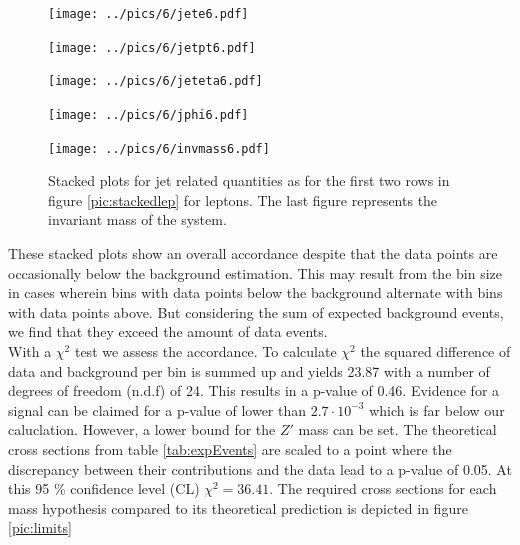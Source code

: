 \begin{figure}
\begin{minipage}{\minwidththree\textwidth}
 \texttt{[image: ../pics/6/jete6.pdf]}
\end{minipage}
\begin{minipage}{\minwidththree\textwidth}
 \texttt{[image: ../pics/6/jetpt6.pdf]}
\end{minipage}


\begin{minipage}{\minwidththree\textwidth}
 \texttt{[image: ../pics/6/jeteta6.pdf]}
\end{minipage}
\begin{minipage}{\minwidththree\textwidth}
 \texttt{[image: ../pics/6/jphi6.pdf]}
\end{minipage}


\begin{minipage}{0.8\textwidth}
 \texttt{[image: ../pics/6/invmass6.pdf]}
\end{minipage}
\caption{\small{Stacked plots for jet related quantities as for the first two rows in figure \ref{pic:stackedlep} for leptons. The last figure represents
the invariant mass of the system. }}
\label{pic:stackedjet} 
\end{figure}
These stacked plots show an overall accordance despite that the data points are occasionally below the background estimation. This may result from 
the bin size in cases wherein bins with data points below the background alternate with bins with data points above. But considering the sum of
expected background events, we find that they exceed the amount of data events. \\
\noindent With a $\chi^2$ test we assess the accordance. To calculate $\chi^2$ the squared difference of data and background per bin is summed up
and yields 23.87 with a number of degrees of freedom (n.d.f) of 24. This results in a p-value of 0.46. Evidence for a signal can be claimed
for a p-value of lower than $2.7\cdot 10^{-3}$ which is far below our caluclation. However, a lower bound for the $Z'$ mass can be set. The 
theoretical cross sections from table \ref{tab:expEvents} are scaled to a point where the discrepancy between their contributions and the data
lead to a p-value of 0.05. At this 95 \% confidence level (CL) $\chi^2 = 36.41$. The required cross sections for each mass hypothesis compared to
its theoretical prediction is depicted in figure \ref{pic:limits}
